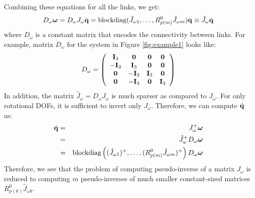 
Combining these equations for all the links, we get:
\begin{eqnarray}
D_{\omega} \bm{\omega} = D_{\omega} J_{\omega} \dot{\mathbf{q}} = \mbox{blockdiag}(\hat{J}_{\omega 1},\hdots,R^0_{p(m)}\hat{J}_{\omega m})\dot{\mathbf{q}} \equiv \hat{J}_{\omega}\dot{\mathbf{q}}
\end{eqnarray}
where $D_{\omega}$ is a constant matrix that encodes the connectivity between links. For example, matrix $D_{\omega}$ for the system in Figure \ref{fig:example1} looks
like:
\begin{equation}
D_{\omega} =
\left (
\begin{array}{cccc}
\mathbf{I}_{3}  & \mathbf{0} & \mathbf{0} & \mathbf{0}\\
-\mathbf{I}_{3} & \mathbf{I}_{3}  & \mathbf{0} & \mathbf{0}\\
\mathbf{0} & -\mathbf{I}_{3} & \mathbf{I}_{3}  & \mathbf{0}\\
\mathbf{0} & -\mathbf{I}_{3} & \mathbf{0} & \mathbf{I}_{3}\\
\end{array}
\right )  
\end{equation}
In addition, the matrix $\hat{J}_{\omega} = D_{\omega} J_{\omega}$ is much sparser as compared to ${J}_{\omega}$. For only rotational DOFs, it is sufficient to invert only $J_{\omega}$. Therefore, we can compute $\dot{\mathbf{q}}$ as:
\begin{eqnarray}
\nonumber
 \dot{\mathbf{q}} & = & J_{\omega}^+ \bm{\omega}\\
 \nonumber
 & = &  \hat{J}_{\omega}^+ D_{\omega}\bm{\omega}\\
 & = & \mbox{blockdiag}\left((\hat{J}_{\omega 1})^+,\hdots,(R^0_{p(m)}\hat{J}_{\omega m})^+\right ) D_{\omega}\bm{\omega}
\end{eqnarray}
Therefore, we see that the problem of computing pseudo-inverse of a matrix $J_{\omega}$ is reduced to computing $m$ pseudo-inverses of much smaller constant-sized matrices $R^0_{p(k)}\hat{J}_{\omega k}$.


